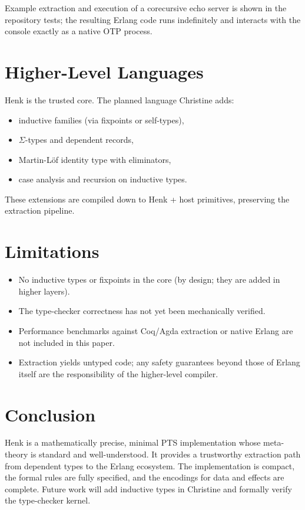 \documentclass{article}
\begin{document}
Example extraction and execution of a corecursive echo server is shown in the repository tests; the resulting Erlang code
runs indefinitely and interacts with the console exactly as a native OTP process.

\section{Higher-Level Languages}

Henk is the trusted core. The planned language Christine adds:

\begin{itemize}
\item inductive families (via fixpoints or self-types),
\item $\Sigma$-types and dependent records,
\item Martin-Löf identity type with eliminators,
\item case analysis and recursion on inductive types.
\end{itemize}

These extensions are compiled down to Henk + host primitives, preserving the extraction pipeline.

\section{Limitations}

\begin{itemize}
\item No inductive types or fixpoints in the core (by design; they are added in higher layers).
\item The type-checker correctness has not yet been mechanically verified.
\item Performance benchmarks against Coq/Agda extraction or native Erlang are not included in this paper.
\item Extraction yields untyped code; any safety guarantees beyond those of Erlang itself are the responsibility of the higher-level compiler.
\end{itemize}

\section{Conclusion}

Henk is a mathematically precise, minimal PTS implementation whose meta-theory is standard and well-understood.
It provides a trustworthy extraction path from dependent types to the Erlang ecosystem.
The implementation is compact, the formal rules are fully specified, and the encodings for data and effects are complete.
Future work will add inductive types in Christine and formally verify the type-checker kernel.
\end{document}
